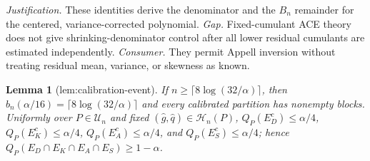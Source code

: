 \documentclass{article}
\newtheorem{lemma}{Lemma}
\begin{document}
\par\smallskip\noindent \textit{Justification.} These identities derive the denominator and the \(B_n\) remainder for the centered, variance-corrected polynomial. \textit{Gap.} Fixed-cumulant ACE theory does not give shrinking-denominator control after all lower residual cumulants are estimated independently. \textit{Consumer.} They permit Appell inversion without treating residual mean, variance, or skewness as known.

\begin{lemma}[lem:calibration-event]\label{lem:calibration-event}
If \(n\ge\lceil8\log(32/\alpha)\rceil\), then \(b_n(\alpha/16)=\lceil8\log(32/\alpha)\rceil\) and every calibrated partition has nonempty blocks. Uniformly over \(P\in\mathcal U_n\) and fixed \((\widehat g,\widehat q)\in\mathcal H_n(P)\), \(Q_P(E_D^c)\le\alpha/4\), \(Q_P(E_K^c)\le\alpha/4\), \(Q_P(E_A^c)\le\alpha/4\), and \(Q_P(E_S^c)\le\alpha/4\); hence \(Q_P(E_D\cap E_K\cap E_A\cap E_S)\ge1-\alpha\).
\end{lemma}
\end{document}
